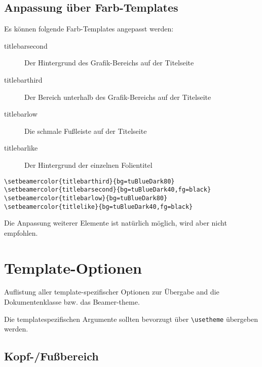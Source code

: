 \subsection{Anpassung über Farb-Templates}

Es können folgende Farb-Templates angepasst werden:
\begin{description}
  \item[\color{tuRed100}\ttfamily titlebarsecond]
    Der Hintergrund des Grafik-Bereichs auf der Titelseite
  \item[\color{tuRed100}\ttfamily titlebarthird]
    Der Bereich unterhalb des Grafik-Bereichs auf der Titelseite
  \item[\color{tuRed100}\ttfamily titlebarlow]
    Die schmale Fußleiste auf der Titelseite
  \item[\color{tuRed100}\ttfamily titlebarlike]
    Der Hintergrund der einzelnen Folientitel
\end{description}

\example

\begin{lstlisting}
\setbeamercolor{titlebarthird}{bg=tuBlueDark80}
\setbeamercolor{titlebarsecond}{bg=tuBlueDark40,fg=black}
\setbeamercolor{titlebarlow}{bg=tuBlueDark80}
\setbeamercolor{titlelike}{bg=tuBlueDark40,fg=black}
\end{lstlisting}

Die Anpassung weiterer Elemente ist natürlich möglich,
wird aber nicht empfohlen.

\section{Template-Optionen}\label{beamer:optionen}


Auflistung aller template-spezifischer Optionen zur Übergabe and die
Dokumentenklasse bzw. das Beamer-theme.

Die templatespezifischen Argumente sollten bevorzugt
über \lstinline!\usetheme! übergeben werden.

\subsection{Kopf-/Fußbereich}

